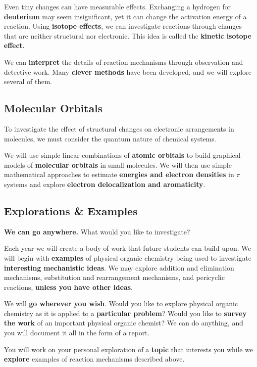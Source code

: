 Even tiny changes can have measurable effects. Exchanging a hydrogen for \textbf{deuterium} may seem insignificant, yet it can change the activation energy of a reaction. Using \textbf{isotope effects}, we can investigate reactions through changes that are neither structural nor electronic. This idea is called the \textbf{kinetic isotope effect}.

We can \textbf{interpret} the details of reaction mechanisms through observation and detective work. Many \textbf{clever methods} have been developed, and we will explore several of them.

\subsection{Molecular Orbitals}

To investigate the effect of structural changes on electronic arrangements in molecules, we must consider the quantum nature of chemical systems.

We will use simple linear combinations of \textbf{atomic orbitals} to build graphical models of \textbf{molecular orbitals} in small molecules. We will then use simple mathematical approaches to estimate \textbf{energies and electron densities} in $\pi$ systems and explore \textbf{electron delocalization and aromaticity}.

\subsection{Explorations \& Examples}

\textbf{We can go anywhere.} What would you like to investigate?

Each year we will create a body of work that future students can build upon. We will begin with \textbf{examples} of physical organic chemistry being used to investigate \textbf{interesting mechanistic ideas}. We may explore addition and elimination mechanisms, substitution and rearrangement mechanisms, and pericyclic reactions, \textbf{unless you have other ideas}.

We will \textbf{go wherever you wish}. Would you like to explore physical organic chemistry as it is applied to a \textbf{particular problem}? Would you like to \textbf{survey the work} of an important physical organic chemist? We can do anything, and you will document it all in the form of a report.

You will work on your personal exploration of a \textbf{topic} that interests you while we \textbf{explore} examples of reaction mechanisms described above.

